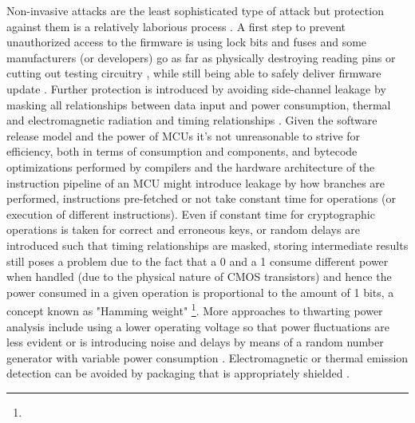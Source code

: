 Non-invasive attacks are the least sophisticated type of attack but protection against them is a relatively laborious process \citep{anderson:cautionary_note}. A first step to prevent unauthorized access to the firmware is using lock bits and fuses \citep{atmega_manual} \citep{tech:avrfreaks} and some manufacturers (or developers) go as far as physically destroying reading pins or cutting out testing circuitry \citep{sergei:thesis}, while still being able to safely deliver firmware update \citep{tech:aes_bls}. Further protection is introduced by avoiding side-channel leakage by masking all relationships between data input and power consumption, thermal and electromagnetic radiation and timing relationships \citep{kocher:DPA} \cite{sergei:thesis}. Given the software release model and the power of MCUs it's not unreasonable to strive for efficiency, both in terms of consumption and components, and bytecode optimizations performed by compilers and the hardware architecture of the instruction pipeline of an MCU might introduce leakage \citep{kocher:DPA}  \citep{sergei:thesis} by how branches are performed, instructions pre-fetched or not take constant time for operations (or execution of different instructions). Even if constant time for cryptographic operations is taken for correct and erroneous keys, or random delays are introduced such that timing relationships are masked, storing intermediate results still poses a problem due to the fact that a 0 and a 1 consume different power when handled (due to the physical nature of CMOS transistors) and hence the power consumed in a given operation is proportional to the amount of 1 bits, a concept known as "Hamming weight" \citep{website:riscure} \citep{kocher:DPA} \footnote{}. More approaches to thwarting power analysis include using a lower operating voltage so that power fluctuations are less evident or is introducing noise and delays by means of a random number generator with variable power consumption \citep{kocher:DPA} \citep{hwre} \citep{avr_mega}. Electromagnetic or thermal emission detection can be avoided by packaging that is appropriately shielded \citep{website:ibm_secure} \citep{kocher:DPA}. 

